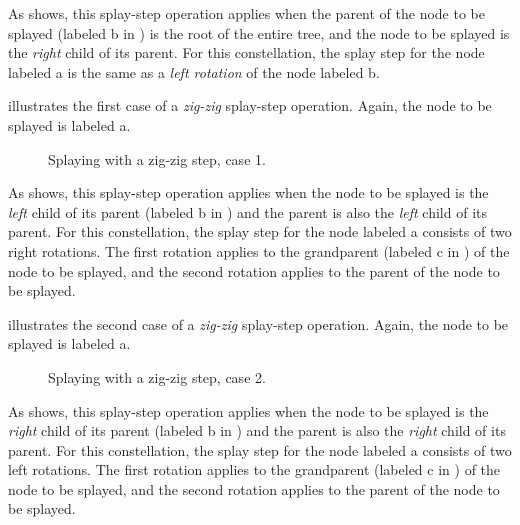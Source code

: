 As  shows, this splay-step operation applies
when the parent of the node to be splayed (labeled \textsf{b} in
) is the root of the entire tree, and the node
to be splayed is the \emph{right} child of its parent.  For this
constellation, the splay step for the node labeled \textsf{a} is the
same as a \emph{left rotation} of the node labeled \textsf{b}.

 illustrates the first case of a
\emph{zig-zig} splay-step operation.  Again, the node to be splayed is
labeled \textsf{a}.

\begin{figure}
\begin{center}
\end{center}
\caption{\label{fig-splay-zig-zig-1}
Splaying with a zig-zig step, case 1.}
\end{figure}

As  shows, this splay-step operation
applies when the node to be splayed is the \emph{left} child of its
parent (labeled \textsf{b} in ) and the
parent is also the \emph{left} child of its parent.  For this
constellation, the splay step for the node labeled \textsf{a} consists
of two right rotations.  The first rotation applies to the grandparent
(labeled \textsf{c} in ) of the node to be
splayed, and the second rotation applies to the parent of the node to
be splayed.

 illustrates the second case of a
\emph{zig-zig} splay-step operation.  Again, the node to be splayed is
labeled \textsf{a}.

\begin{figure}
\begin{center}
\end{center}
\caption{\label{fig-splay-zig-zig-2}
Splaying with a zig-zig step, case 2.}
\end{figure}

As  shows, this splay-step operation
applies when the node to be splayed is the \emph{right} child of its
parent (labeled \textsf{b} in ) and the
parent is also the \emph{right} child of its parent.  For this
constellation, the splay step for the node labeled \textsf{a} consists
of two left rotations.  The first rotation applies to the grandparent
(labeled \textsf{c} in ) of the node to be
splayed, and the second rotation applies to the parent of the node to
be splayed.

